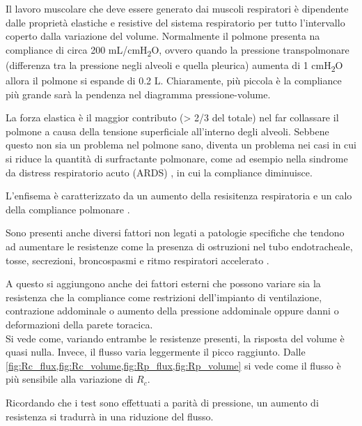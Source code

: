 Il lavoro muscolare che deve essere generato dai muscoli respiratori è dipendente dalle proprietà elastiche e resistive del sistema respiratorio per tutto l'intervallo coperto dalla variazione del volume. Normalmente il polmone presenta na compliance di circa 200 mL/cmH\textsubscript{2}O, ovvero quando la pressione transpolmonare (differenza tra la pressione negli alveoli e quella pleurica) aumenta di 1 cmH\textsubscript{2}O allora il polmone si espande di 0.2 L. Chiaramente, più piccola è la compliance più grande sarà la pendenza nel diagramma pressione-volume. 

La forza elastica è il maggior contributo (> 2/3 del totale) nel far collassare il polmone a causa della tensione superficiale all'interno degli alveoli. Sebbene questo non sia un problema nel polmone sano, diventa un problema nei casi in cui si riduce la quantità di surfractante polmonare, come ad esempio nella sindrome da distress respiratorio acuto (ARDS) \cite{milic-emili_basics_1999}, in cui la compliance diminuisce. 

L'enfisema è caratterizzato da un aumento della resisitenza respiratoria e un calo della compliance polmonare \cite{milic-emili_basics_1999}.

Sono presenti anche diversi fattori non legati a patologie specifiche che tendono ad aumentare le resistenze come la presenza di ostruzioni nel tubo endotracheale, tosse, secrezioni, broncospasmi e ritmo respiratori accelerato \cite{grossbach_overview_2011}.

A questo si aggiungono anche dei fattori esterni che possono variare sia la resistenza che la compliance come restrizioni dell'impianto di ventilazione, contrazione addominale o aumento della pressione addominale oppure danni o deformazioni della parete toracica.
\\

Si vede come, variando entrambe le resistenze presenti, la risposta del volume è quasi nulla. Invece, il flusso varia leggermente il picco raggiunto. Dalle \cref{fig:Rc_flux,fig:Rc_volume,fig:Rp_flux,fig:Rp_volume} si vede come il flusso è più sensibile alla variazione di $R_c$.

Ricordando che i test sono effettuati a parità di pressione, un aumento di resistenza si tradurrà in una riduzione del flusso. 

